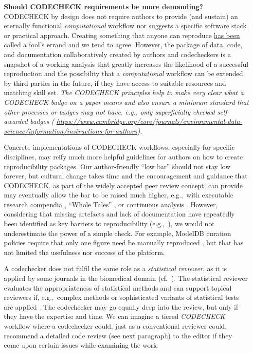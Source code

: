 \documentclass[12pt]{article}
\newcommand{\rev}[1]{\textit{#1}}
\begin{document}
\textbf{Should CODECHECK requirements be more demanding?}
CODECHECK by design does not require authors to provide (and sustain)
an eternally functional \rev{computational} workflow nor suggests a specific software
stack or practical approach.
Creating something
that anyone can reproduce \href{https://twitter.com/DougBlank/status/1135904909663068165}{has been called a fool's
errand}
and we tend to agree.  However, the package of data, code, and
documentation collaboratively created by authors and codecheckers is a
snapshot of a working analysis that greatly increases the likelihood
of a successful reproduction and the possibility that a \rev{computational} workflow can
be extended by third parties in the future, if they have
access to suitable resources and matching skill set.
\rev{The CODECHECK principles help to make very clear what a CODECHECK
badge on a paper means and also ensure a minimum standard that 
other processes or badges may not have, e.g., only superficially 
checked self-awarded badges (
\url{https://www.cambridge.org/core/journals/environmental-data-science/information/instructions-for-authors}).}

Concrete
implementations of CODECHECK workflows, especially for specific
disciplines, may reify much more helpful guidelines for authors on how
to create reproducibility packages.  Our author-friendly ``low bar''
should not stay low forever, but cultural change takes time and the
encouragement and guidance that CODECHECK, as part of the widely
accepted peer review concept, can provide may eventually allow the bar
to be raised much higher, e.g.,~with executable research
compendia \cite{nust_opening_2017}, ``Whole Tales''
\cite{brinckman_computing_2018}, or continuous analysis
\cite{beaulieu-jones_reproducibility_2017-1}.  However, considering
that missing artefacts and lack of documentation have repeatedly been
identified as key barriers to reproducibility
(e.g.,~\cite{stagge_assessing_2019,nust_improving_2020}), we would not
underestimate the power of a simple check.  For example, ModelDB
curation policies require that only one figure need be manually reproduced
\cite{mcdougal_reproducibility_2016}, but that has not limited the
usefulness nor success of the platform.

A codechecker does not fulfil the same role as a \emph{statistical
  reviewer}, as it is applied by some journals in the biomedical
domain (cf.~\cite{petrovecki_role_2009,greenwood_how_2015}).  The
statistical reviewer evaluates the appropriateness of statistical
methods \cite{greenwood_how_2015} and can support topical reviewers
if, e.g.,~complex methods or sophisticated variants of statistical
tests are applied \cite{petrovecki_role_2009}.  The codechecker may go
equally deep into the review, but only if they have the expertise and
time. We can imagine a tiered \rev{CODECHECK} workflow where a codechecker could, just
as a conventional reviewer could, recommend a detailed code review
(see next paragraph) to the editor if they come upon certain issues while
examining the work.
\end{document}
